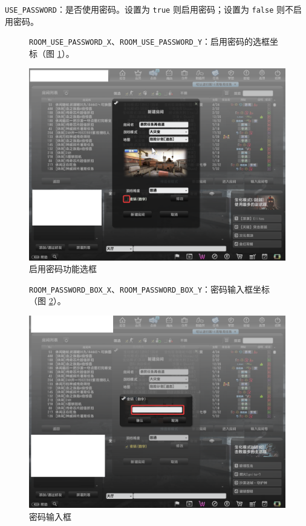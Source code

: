 \lstinline{USE_PASSWORD}：是否使用密码。设置为 \lstinline{true} 则启用密码；设置为 \lstinline{false} 则不启用密码。

\begin{figure}[H]
    \Centering
    \parbox[l]{\textwidth}{\lstinline{ROOM_USE_PASSWORD_X}、\lstinline{ROOM_USE_PASSWORD_Y}：启用密码的选框坐标（图 \ref{ch2fig-use-password}）。}
    \includegraphics[width=\textwidth]{docs/assets/use_password.png}
    \caption{启用密码功能选框}
    \label{ch2fig-use-password}
\end{figure}
\clearpage

\begin{figure}[H]
    \Centering
    \parbox[l]{\textwidth}{\lstinline{ROOM_PASSWORD_BOX_X}、\lstinline{ROOM_PASSWORD_BOX_Y}：密码输入框坐标（图 \ref{ch2fig-password-box}）。}
    \includegraphics[width=\textwidth]{docs/assets/password_box.png}
    \caption{密码输入框}
    \label{ch2fig-password-box}
\end{figure}
\clearpage

